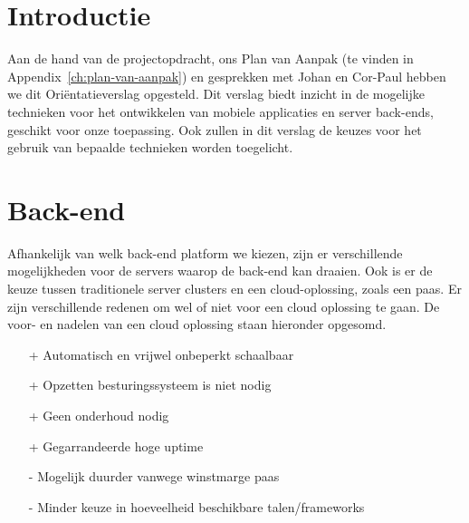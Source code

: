 \section{Introductie}

\ifx\aanleiding\undefined

\fi

Aan de hand van de projectopdracht, ons Plan van Aanpak (te vinden in Appendix~\ref{ch:plan-van-aanpak}) en gesprekken met Johan en Cor-Paul hebben we dit Ori\"entatieverslag opgesteld. Dit verslag biedt inzicht in de mogelijke technieken voor het ontwikkelen van mobiele applicaties en server back-ends, geschikt voor onze toepassing. Ook zullen in dit verslag de keuzes voor het gebruik van bepaalde technieken worden toegelicht.

\section{Back-end}\label{sec:orientatie-back-end}
Afhankelijk van welk back-end platform we kiezen, zijn er verschillende mogelijkheden voor de servers waarop de back-end kan draaien. Ook is er de keuze tussen traditionele server clusters en een cloud-oplossing, zoals een \ac{paas}. Er zijn verschillende redenen om wel of niet voor een cloud oplossing te gaan. De voor- en nadelen van een cloud oplossing staan hieronder opgesomd.
\begin{itemize} 
    \item[+] Automatisch en vrijwel onbeperkt schaalbaar
    \item[+] Opzetten besturingssysteem is niet nodig
    \item[+] Geen onderhoud nodig
    \item[+] Gegarrandeerde hoge uptime
    \item[-] Mogelijk duurder vanwege winstmarge \ac{paas}
    \item[-] Minder keuze in hoeveelheid beschikbare talen/frameworks
\end{itemize}


